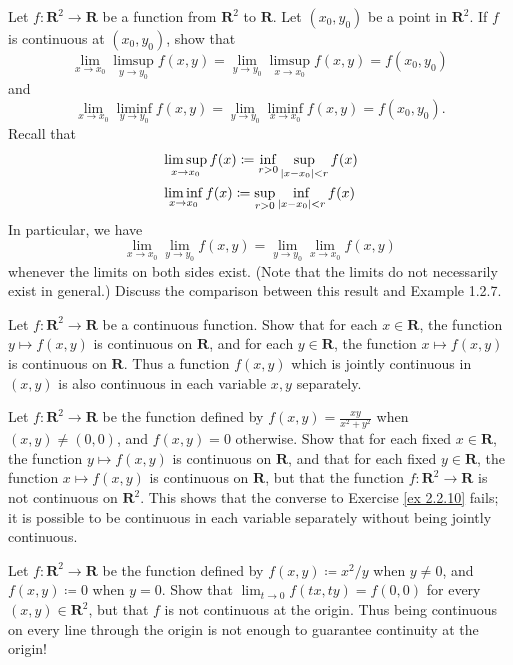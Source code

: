 \begin{exercise}\label{ex 2.2.9}
    Let \(f : \mathbf{R}^2 \to \mathbf{R}\) be a function from \(\mathbf{R}^2\) to \(\mathbf{R}\).
    Let \((x_0, y_0)\) be a point in \(\mathbf{R}^2\).
    If \(f\) is continuous at \((x_0, y_0)\), show that
    \[
        \lim_{x \to x_0} \limsup_{y \to y_0} f(x, y) = \lim_{y \to y_0} \limsup_{x \to x_0} f(x, y) = f(x_0, y_0)
    \]
    and
    \[
        \lim_{x \to x_0} \liminf_{y \to y_0} f(x, y) = \lim_{y \to y_0} \liminf_{x \to x_0} f(x, y) = f(x_0, y_0).
    \]
    Recall that
    \begin{align*}
         & \limsup_{x \to x_0} f(x) \coloneqq \inf_{r > 0} \sup_{\abs*{x - x_0} < r} f(x) \\
         & \liminf_{x \to x_0} f(x) \coloneqq \sup_{r > 0} \inf_{\abs*{x - x_0} < r} f(x)
    \end{align*}
    In particular, we have
    \[
        \lim_{x \to x_0} \lim_{y \to y_0} f(x, y) = \lim_{y \to y_0} \lim_{x \to x_0} f(x, y)
    \]
    whenever the limits on both sides exist.
    (Note that the limits do not necessarily exist in general.)
    Discuss the comparison between this result and Example 1.2.7.
\end{exercise}

\begin{exercise}\label{ex 2.2.10}
    Let \(f : \mathbf{R}^2 \to \mathbf{R}\) be a continuous function.
    Show that for each \(x \in \mathbf{R}\), the function \(y \mapsto f(x, y)\) is continuous on \(\mathbf{R}\), and for each \(y \in \mathbf{R}\), the function \(x \mapsto f(x, y)\) is continuous on \(\mathbf{R}\).
    Thus a function \(f(x, y)\) which is jointly continuous in \((x, y)\) is also continuous in each variable \(x, y\) separately.
\end{exercise}

\begin{exercise}\label{ex 2.2.11}
    Let \(f : \mathbf{R}^2 \to \mathbf{R}\) be the function defined by \(f(x, y) = \frac{xy}{x^2 + y^2}\) when \((x, y) \neq (0, 0)\), and \(f(x, y) = 0\) otherwise.
    Show that for each fixed \(x \in \mathbf{R}\), the function \(y \mapsto f(x, y)\) is continuous on \(\mathbf{R}\), and that for each fixed \(y \in \mathbf{R}\), the function \(x \mapsto f(x, y)\) is continuous on \(\mathbf{R}\), but that the function \(f : \mathbf{R}^2 \to \mathbf{R}\) is not continuous on \(\mathbf{R}^2\).
    This shows that the converse to Exercise \ref{ex 2.2.10} fails;
    it is possible to be continuous in each variable separately without being jointly continuous.
\end{exercise}

\begin{exercise}\label{ex 2.2.12}
    Let \(f: \mathbf{R}^2 \to \mathbf{R}\) be the function defined by \(f(x, y) \coloneqq x^2 / y\) when \(y \neq 0\), and \(f(x, y) \coloneqq 0\) when \(y = 0\).
    Show that \(\lim_{t \to 0} f(tx, ty) = f(0, 0)\) for every \((x, y) \in \mathbf{R}^2\), but that \(f\) is not continuous at the origin.
    Thus being continuous on every line through the origin is not enough to guarantee continuity at the origin!
\end{exercise}